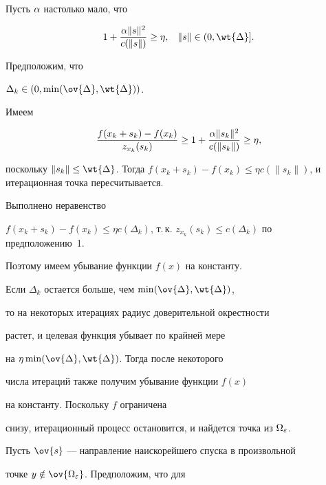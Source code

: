 \begin{pf}


Пусть $\alpha$ настолько мало, что


$$


1 + \frac{\ga \|s\|^2}{c(\|s\|)}


\geq \eta, \;\;\; \|s\| \in (0,\wt{\Delta}].


$$


Предположим, что


$\Delta_k \in (0, \min (\ov{\Delta}, \wt{\Delta}))$.


Имеем


$$


\frac{f(x_k+s_k) -


f(x_k)}{z_{x_{k}} (s_k)} \geq 1 + \frac{\ga \|s_k\|^2}{c(\|s_k\|)}


\geq \eta,


$$


поскольку $\|s_k\| \leq \wt{\Delta}$. Тогда $f(x_k+s_k) -


f(x_k) \leq \eta c(\|s_k\|)$, и итерационная точка пересчитывается.


Выполнено неравенство


$f(x_k+s_k) - f(x_k) \leq \eta c(\Delta_k)$, т.\,к. $z_{x_{k}}


(s_k) \leq c(\Delta_k)$ по предположению~1. 


Поэтому имеем убывание функции $f(x)$ на константу.





Если $\Delta_k$ остается больше, чем $\min (\ov{\Delta}, \wt{\Delta})$,


то на некоторых итерациях радиус доверительной окрестности


растет, и целевая функция убывает по крайней мере


на $\eta \min (\ov{\Delta}, \wt{\Delta})$. Тогда после некоторого


числа итераций также получим убывание функции $f(x)$


на константу. Поскольку $f$ ограничена


снизу, итерационный процесс остановится, и найдется точка из $\Omega_{\varepsilon}$.


\end{pf}





Пусть $\ov{s}$ --- направление наискорейшего спуска в произвольной


точке $y \notin \ov{\Omega_{\e}}$. Предположим, что для


